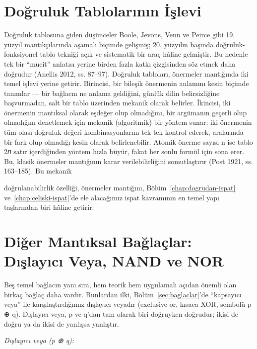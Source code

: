 \section{Doğruluk Tablolarının İşlevi}\label{sec:dt-islev}

Doğruluk tablosuna giden düşünceler Boole, Jevons, Venn ve Peirce gibi 19. yüzyıl mantıkçılarında aşamalı biçimde gelişmiş; 20. yüzyılın başında doğruluk-fonksiyonel tablo tekniği açık ve sistematik bir araç hâline gelmiştir. Bu nedenle tek bir “mucit” anlatısı yerine birden fazla katkı çizgisinden söz etmek daha doğrudur (Anellis 2012, ss. 87–97). Doğruluk tabloları, önermeler mantığında iki temel işlevi yerine getirir. Birincisi, bir bileşik önermenin anlamını kesin biçimde tanımlar — bir bağlacın ne anlama geldiğini, günlük dilin belirsizliğine başvurmadan, salt bir tablo üzerinden mekanik olarak belirler. İkincisi, iki önermenin mantıksal olarak eşdeğer olup olmadığını, bir argümanın geçerli olup olmadığını denetlemek için mekanik (algoritmik) bir yöntem sunar: iki önermenin tüm olası doğruluk değeri kombinasyonlarını tek tek kontrol ederek, aralarında bir fark olup olmadığı kesin olarak belirlenebilir. Atomik önerme sayısı n ise tablo 2𝑛 satır içerdiğinden yöntem hızla büyür, fakat her sonlu formül için sona erer. Bu, klasik önermeler mantığının karar verilebilirliğini somutlaştırır (Post 1921, ss. 163–185). Bu mekanik

doğrulanabilirlik özelliği, önermeler mantığını, Bölüm~\ref{chap:dogrudan-ispat} ve~\ref{chap:celiski-ispat}’de ele alacağımız ispat kavramının en temel yapı taşlarından biri hâline getirir.

\section{Diğer Mantıksal Bağlaçlar: Dışlayıcı Veya, NAND ve NOR}\label{sec:nand}

Beş temel bağlacın yanı sıra, hem teorik hem uygulamalı açıdan önemli olan birkaç bağlaç daha vardır. Bunlardan ilki, Bölüm~\ref{sec:baglaclar}’de “kapsayıcı veya” ile karşılaştırdığımız dışlayıcı veyadır (exclusive or, kısaca XOR, sembolü p ⊕ q). Dışlayıcı veya, p ve q’dan tam olarak biri doğruyken doğrudur; ikisi de doğru ya da ikisi de yanlışsa yanlıştır.

\par\smallskip\begin{center}{\small\itshape\sffamily\color{gray}Dışlayıcı veya (p ⊕ q):}\par{}\end{center}\par\smallskip

